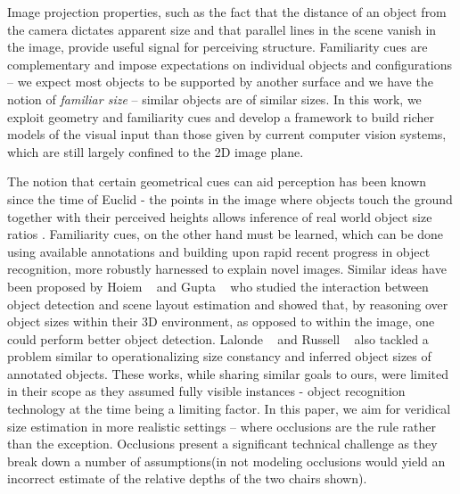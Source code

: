 Image projection properties, such as the fact that the distance of an object from the camera dictates apparent size and that parallel lines in the scene vanish in the image, provide useful signal for perceiving structure. Familiarity cues are complementary and impose expectations on individual objects and configurations -- we expect most objects to be supported by another surface and we have the notion of \textit{familiar size} -- similar objects are of similar sizes. In this work, we exploit geometry and familiarity cues and develop a framework to build richer models of the visual input than those given by current computer vision systems, which are still largely confined to the 2D image plane.

The notion that certain geometrical cues can aid perception has been known since the time of Euclid - the points in the image where objects touch the ground together with their perceived heights allows inference of real world object size ratios \cite{burton45}. Familiarity cues, on the other hand must be learned, which can be done using available annotations and building upon rapid recent progress in object recognition, more robustly harnessed to explain novel images. Similar ideas have been proposed by Hoiem \etal~\cite{hoiem2008putting,Hoiem:book} and Gupta \etal ~\cite{gupta2010blocks} who studied the interaction between object detection and scene layout estimation and showed that, by reasoning over object sizes within their 3D environment, as opposed to within the image, one could perform better object detection. Lalonde \etal~\cite{lalonde2007photo} and Russell \etal~\cite{russell2009building} also tackled a problem similar to operationalizing size constancy and inferred object sizes of annotated objects. These works, while sharing similar goals to ours, were limited in their scope as they assumed fully visible instances - object recognition technology at the time being a limiting factor. In this paper, we aim for veridical size estimation in more realistic settings -- where occlusions are the rule rather than the exception. Occlusions present a significant technical challenge as they break down a number of assumptions(\eg in 
 not modeling occlusions would yield an incorrect estimate of the relative depths of the two chairs shown).

